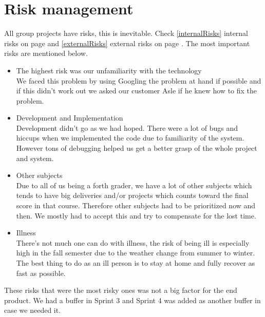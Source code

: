 \section{Risk management}
All group projects have risks, this is inevitable. Check \ref{internalRisks} internal risks on page \pageref{internalRisks} and \ref{externalRisks} external risks on page \pageref{externalRisks}. The most important risks are mentioned below.

\begin{itemize}
\item The highest risk was our unfamiliarity with the technology \\ We faced this problem by using Googling the problem at hand if possible and if this didn't work out we asked our customer Asle if he knew how to fix the problem.
\item Development and Implementation \\ Development didn't go as we had hoped. There were a lot of bugs and hiccups when we implemented the code due to familiarity of the system. However tons of debugging helped us get a better grasp of the whole project and system.
\item Other subjects \\Due to all of us being a forth grader, we have a lot of other subjects which tends to have big deliveries and/or projects which counts toward the final score in that course. Therefore other subjects had to be prioritized now and then. We mostly had to accept this and try to compensate for the lost time.
\item Illness \\ There's not much one can do with illness, the risk of being ill is especially high in the fall semester due to the weather change from summer to winter. The best thing to do as an ill person is to stay at home and fully recover as fast as possible. 
\end{itemize}
These risks that were the most risky ones was not a big factor for the end product. We had a buffer in Sprint 3 and Sprint 4 was added as another buffer in case we needed it.
